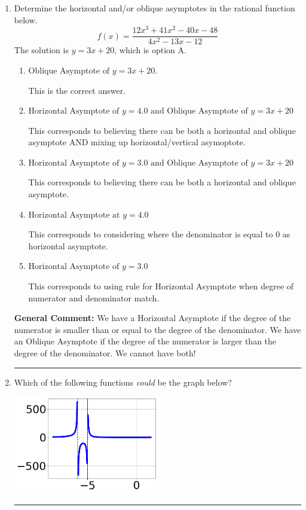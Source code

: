 \documentclass{extbook}[14pt]
\newcommand{\litem}[1]{\item #1

\rule{\textwidth}{0.4pt}}
\begin{document}
\begin{enumerate}\litem{
Determine the horizontal and/or oblique asymptotes in the rational function below.
\[ f(x) = \frac{12x^{3} +41 x^{2} -40 x -48}{4x^{2} -13 x -12} \]The solution is \( y = 3x + 20 \), which is option A.\begin{enumerate}[label=\Alph*.]
\item \( \text{Oblique Asymptote of } y = 3x + 20. \)

This is the correct answer.
\item \( \text{Horizontal Asymptote of } y = 4.0 \text{ and Oblique Asymptote of } y = 3x + 20 \)

This corresponds to believing there can be both a horizontal and oblique asymptote AND mixing up horizontal/vertical asymoptote.
\item \( \text{Horizontal Asymptote of } y = 3.0 \text{ and Oblique Asymptote of } y = 3x + 20 \)

This corresponds to believing there can be both a horizontal and oblique asymptote.
\item \( \text{Horizontal Asymptote at } y = 4.0 \)

This corresponds to considering where the denominator is equal to 0 as horizontal asymptote.
\item \( \text{Horizontal Asymptote of } y = 3.0  \)

This corresponds to using rule for Horizontal Asymptote when degree of numerator and denominator match.
\end{enumerate}

\textbf{General Comment:} We have a Horizontal Asymptote if the degree of the numerator is smaller than or equal to the degree of the denominator. We have an Oblique Asymptote if the degree of the numerator is larger than the degree of the denominator. We cannot have both!
}
\litem{
Which of the following functions \textit{could} be the graph below?

\begin{center}
    \includegraphics[width=0.5\textwidth]{../Figures/identifyGraphOfRationalFunctionB.png}
\end{center}


}
\end{enumerate}
\end{document}
